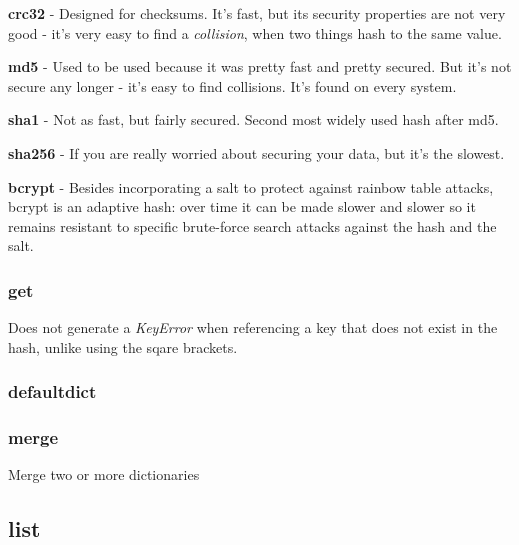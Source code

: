\documentclass[12pt]{article}
\begin{document}
\begin{list}{*}{
\setlength{\itemsep}{0pt}
\setlength{\parsep}{0pt}
\setlength{\topsep}{0pt}
\setlength{\partopsep}{0pt}
\setlength{\leftmargin}{2em}
\setlength{\labelwidth}{1.5em}
\setlength{\labelsep}{0.5em}
}
\item \textbf{crc32} - Designed for checksums. It's fast, but its security properties are not very good - it's very easy to find a \emph{collision}, when two things hash to the same value.
\item \textbf{md5} - Used to be used because it was pretty fast and pretty secured. But it's not secure any longer - it's easy to find collisions. It's found on every system.
\item \textbf{sha1} - Not as fast, but fairly secured. Second most widely used hash after md5.
\item \textbf{sha256} - If you are really worried about securing your data, but it's the slowest.
\item \textbf{bcrypt} - Besides incorporating a salt to protect against rainbow table attacks, bcrypt is an adaptive hash: over time it can be made slower and slower so it remains resistant to specific brute-force search attacks against the hash and the salt.
\end{list}

\subsubsection{get}

Does not generate a \emph{KeyError} when referencing a key that does not exist in the hash, unlike using the sqare brackets.




\subsubsection{defaultdict}




\subsubsection{merge}

Merge two or more dictionaries





\subsection{list}
\end{document}

